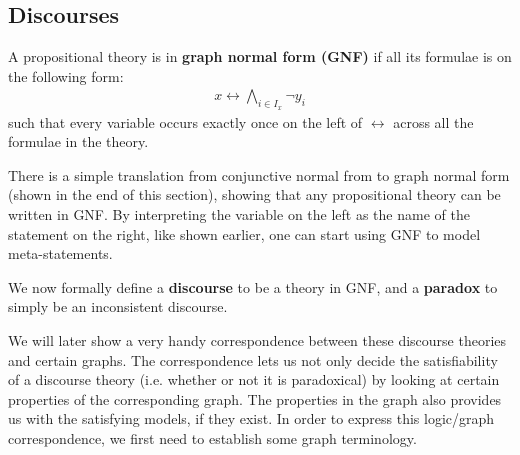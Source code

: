 \subsection{Discourses}
\label{sub:Discourses}
A propositional theory is in \textbf{graph normal form (GNF)} if all its formulae is on the following form:
\begin{align}
  x \leftrightarrow \bigwedge_{i \in I_x} \neg y_i
\end{align}
such that every variable occurs exactly once on the left of $\leftrightarrow$ across all the formulae in the theory.

There is a simple translation from conjunctive normal from to graph normal form (shown in the end of this section), showing that any propositional theory can be written in GNF. By interpreting the variable on the left as the name of the statement on the right, like shown earlier, one can start using GNF to model meta-statements.

We now formally define a \textbf{discourse} to be a theory in GNF, and a \textbf{paradox} to simply be an inconsistent discourse.

We will later show a very handy correspondence between these discourse theories and certain graphs.
The correspondence lets us not only decide the satisfiability of a discourse theory (i.e. whether or not it is paradoxical) by looking at certain properties of the corresponding graph.  The properties in the graph also provides us with the satisfying models, if they exist.
In order to express this logic/graph correspondence, we first need to establish some graph terminology.

